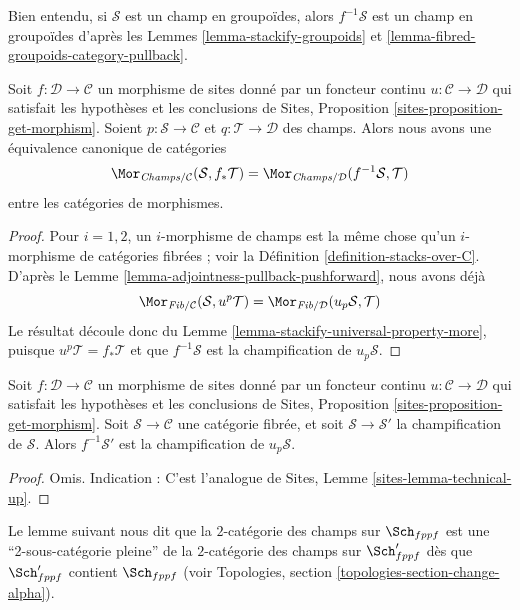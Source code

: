 \noindent
Bien entendu, si $\mathcal{S}$ est un champ en groupoïdes, alors $f^{-1}\mathcal{S}$
est un champ en groupoïdes d'après les
Lemmes \ref{lemma-stackify-groupoids} et
\ref{lemma-fibred-groupoids-category-pullback}.

\begin{lemma}
\label{lemma-adjointness-pullback-pushforward-stacks}
Soit $f : \mathcal{D} \to \mathcal{C}$ un morphisme de sites
donné par un foncteur continu $u : \mathcal{C} \to \mathcal{D}$
qui satisfait les hypothèses et les conclusions de
Sites, Proposition \ref{sites-proposition-get-morphism}.
Soient $p : \mathcal{S} \to \mathcal{C}$ et
$q : \mathcal{T} \to \mathcal{D}$ des champs.
Alors nous avons une équivalence canonique de catégories
$$
\Mor_{\textit{Champs}/\mathcal{C}}(\mathcal{S}, f_*\mathcal{T})
=
\Mor_{\textit{Champs}/\mathcal{D}}(f^{-1}\mathcal{S}, \mathcal{T})
$$
entre les catégories de morphismes.
\end{lemma}

\begin{proof}
Pour $i = 1, 2$, un $i$-morphisme de champs est la même chose qu'un
$i$-morphisme de catégories fibrées ; voir la
Définition \ref{definition-stacks-over-C}.
D'après le
Lemme \ref{lemma-adjointness-pullback-pushforward},
nous avons déjà
$$
\Mor_{\textit{Fib}/\mathcal{C}}(\mathcal{S}, u^p\mathcal{T})
=
\Mor_{\textit{Fib}/\mathcal{D}}(u_p\mathcal{S}, \mathcal{T})
$$
Le résultat découle donc du
Lemme \ref{lemma-stackify-universal-property-more},
puisque $u^p\mathcal{T} = f_*\mathcal{T}$ et que $f^{-1}\mathcal{S}$ est la
champification de $u_p\mathcal{S}$.
\end{proof}

\begin{lemma}
\label{lemma-technical-up}
Soit $f : \mathcal{D} \to \mathcal{C}$ un morphisme de sites
donné par un foncteur continu $u : \mathcal{C} \to \mathcal{D}$
qui satisfait les hypothèses et les conclusions de
Sites, Proposition \ref{sites-proposition-get-morphism}.
Soit $\mathcal{S} \to \mathcal{C}$ une catégorie fibrée, et
soit $\mathcal{S} \to \mathcal{S}'$ la champification de $\mathcal{S}$.
Alors $f^{-1}\mathcal{S}'$ est la champification de
$u_p\mathcal{S}$.
\end{lemma}

\begin{proof}
Omis. Indication :
C'est l'analogue de Sites, Lemme \ref{sites-lemma-technical-up}.
\end{proof}

\noindent
Le lemme suivant nous dit que la $2$-catégorie des champs
sur $\Sch_{fppf}$ est une ``2-sous-catégorie pleine'' de la
$2$-catégorie des champs sur $\Sch'_{fppf}$ dès que
$\Sch'_{fppf}$ contient $\Sch_{fppf}$ (voir
Topologies, section \ref{topologies-section-change-alpha}).


